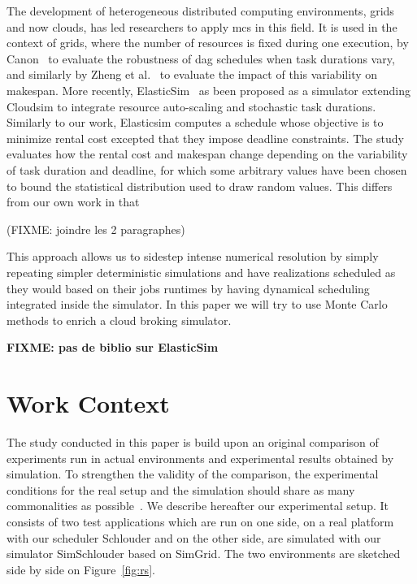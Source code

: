 \documentclass[10pt,conference,compsocconf]{IEEEtran}
\begin{document}
The development  of heterogeneous distributed computing  environments, grids and
now clouds, has led researchers to apply  \ac{mcs} in this field.  It is used in
the  context  of grids,  where  the  number of  resources  is  fixed during  one
execution,  by  Canon~\cite{Canon10}  to  evaluate the  robustness  of  \ac{dag}
schedules when task durations vary, and similarly by Zheng et al.~\cite{Zheng13}
to  evaluate  the  impact  of  this variability  on  makespan.   More  recently,
ElasticSim~\cite{Cai17} as  been proposed as  a simulator extending  Cloudsim to
integrate resource auto-scaling and stochastic  task durations. Similarly to our
work, Elasticsim computes a schedule whose  objective is to minimize rental cost
excepted  that they  impose deadline  constraints. The  study evaluates  how the
rental cost and makespan change depending on the variability of task duration
and deadline, for which some arbitrary values have been chosen to bound
the statistical distribution used to draw random values. This differs 
from our own work in that 

\newline
(FIXME: joindre les 2 paragraphes)
\newline

This approach allows us to sidestep intense numerical resolution by simply
repeating simpler deterministic simulations and have realizations scheduled as
they would based on their jobs runtimes by having dynamical scheduling
integrated inside the simulator. In this paper we will try to use Monte Carlo
methods to enrich a cloud broking simulator.

\textbf{FIXME: pas de biblio sur ElasticSim \cite{cai16}}

\section{Work Context}
\label{sec:work-context}

The  study conducted  in this  paper  is build  upon an  original comparison  of
experiments  run in  actual environments  and experimental  results obtained  by
simulation.   To strengthen  the validity  of the  comparison, the  experimental
conditions  for  the  real  setup  and  the  simulation  should  share  as  many
commonalities  as   possible~\cite{PucherGWK15}.   We  describe   hereafter  our
experimental setup.  It consists of two  test applications which are  run on one
side, on a real platform with our scheduler Schlouder and on the other side, are
simulated  with   our  simulator  SimSchlouder   based  on  SimGrid.    The  two
environments are sketched side by side on Figure~\ref{fig:rs}.
\end{document}
